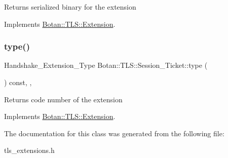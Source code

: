\begin{DoxyReturn}{Returns}
serialized binary for the extension 
\end{DoxyReturn}


Implements \hyperlink{class_botan_1_1_t_l_s_1_1_extension_a56788726ad2526db54e5a26039cb69db}{Botan\+::\+T\+L\+S\+::\+Extension}.

\mbox{\label{class_botan_1_1_t_l_s_1_1_session___ticket_a0fb84fe33c30d28e0dee120ecc2fe228}} 
\subsubsection{\texorpdfstring{type()}{type()}}
{\footnotesize\ttfamily Handshake\+\_\+\+Extension\+\_\+\+Type Botan\+::\+T\+L\+S\+::\+Session\+\_\+\+Ticket\+::type (\begin{DoxyParamCaption}{ }\end{DoxyParamCaption}) const\hspace{0.3cm}{\ttfamily [inline]}, {\ttfamily [override]}, {\ttfamily [virtual]}}

\begin{DoxyReturn}{Returns}
code number of the extension 
\end{DoxyReturn}


Implements \hyperlink{class_botan_1_1_t_l_s_1_1_extension_ac8819b312ce604453225e7b4f7c373ec}{Botan\+::\+T\+L\+S\+::\+Extension}.



The documentation for this class was generated from the following file\+:\begin{DoxyCompactItemize}
\item 
tls\+\_\+extensions.\+h\end{DoxyCompactItemize}
